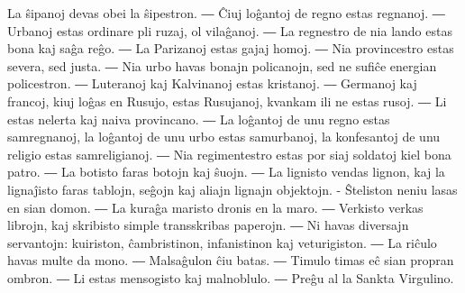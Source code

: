 
La ŝipanoj devas obei la ŝipestron. ― Ĉiuj loĝantoj de regno estas regnanoj. ― Urbanoj estas ordinare pli ruzaj, ol vilaĝanoj. ― La regnestro de nia lando estas bona kaj saĝa reĝo. ― La Parizanoj estas gajaj homoj. ― Nia provincestro estas severa, sed justa. ― Nia urbo havas bonajn policanojn, sed ne sufiĉe energian policestron. ― Luteranoj kaj Kalvinanoj estas kristanoj. ― Germanoj kaj francoj, kiuj loĝas en Rusujo, estas Rusujanoj, kvankam ili ne estas rusoj. ― Li estas nelerta kaj naiva provincano. ― La loĝantoj de unu regno estas samregnanoj, la loĝantoj de unu urbo estas samurbanoj, la konfesantoj de unu religio estas samreligianoj. ― Nia regimentestro estas por siaj soldatoj kiel bona patro. ― La botisto faras botojn kaj ŝuojn. ― La lignisto vendas lignon, kaj la lignaĵisto faras tablojn, seĝojn kaj aliajn lignajn objektojn. - Ŝteliston neniu lasas en sian domon. ― La kuraĝa maristo dronis en la maro. ― Verkisto verkas librojn, kaj skribisto simple transskribas paperojn. ― Ni havas diversajn servantojn: kuiriston, ĉambristinon, infanistinon kaj veturigiston. ― La riĉulo havas multe da mono. ― Malsaĝulon ĉiu batas. ― Timulo timas eĉ sian propran ombron. ― Li estas mensogisto kaj malnoblulo. ― Preĝu al la Sankta Virgulino.

